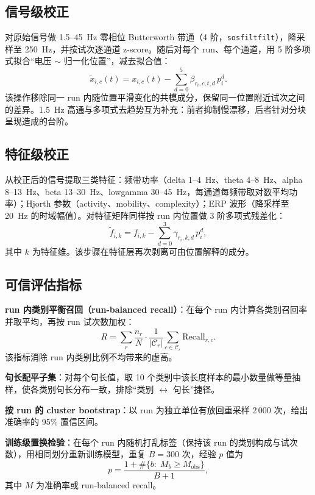 \documentclass[twocolumn,10pt]{ctexart}
\begin{document}
\subsection{信号级校正}

对原始信号做 1.5--45~Hz 零相位 Butterworth 带通（4 阶，\texttt{sosfiltfilt}），降采样至 250~Hz，并按试次逐通道 z-score。随后对每个 run、每个通道，用 5 阶多项式拟合“电压 $\sim$ 归一化位置”，减去拟合值：
\begin{equation}
\tilde{x}_{i,c}(t)=x_{i,c}(t)-\sum_{d=0}^{5}\beta_{r_i,c,t,d}\,p_i^d .
\end{equation}
该操作移除同一 run 内随位置平滑变化的共模成分，保留同一位置附近试次之间的差异。1.5~Hz 高通与多项式去趋势互为补充：前者抑制慢漂移，后者针对分块呈现造成的台阶。

\subsection{特征级校正}

从校正后的信号提取三类特征：频带功率（delta 1--4~Hz、theta 4--8~Hz、alpha 8--13~Hz、beta 13--30~Hz、lowgamma 30--45~Hz，每通道每频带取对数平均功率）；Hjorth 参数（activity、mobility、complexity）；ERP 波形（降采样至 20~Hz 的时域幅值）。对特征矩阵同样按 run 内位置做 3 阶多项式残差化：
\begin{equation}
\tilde{f}_{i,k}=f_{i,k}-\sum_{d=0}^{3}\gamma_{r_i,k,d}\,p_i^d ,
\end{equation}
其中 $k$ 为特征维。该步骤在特征层再次剥离可由位置解释的成分。

\subsection{可信评估指标}

\textbf{run 内类别平衡召回（run-balanced recall）}：在每个 run 内计算各类别召回率并取平均，再按 run 试次数加权：
\begin{equation}
R=\sum_{r}\frac{n_r}{N}\cdot\frac{1}{|\mathcal{C}_r|}\sum_{c\in\mathcal{C}_r}\mathrm{Recall}_{r,c}.
\end{equation}
该指标消除 run 内类别比例不均带来的虚高。

\textbf{句长配平子集}：对每个句长值，取 10 个类别中该长度样本的最小数量做等量抽样，使各类别句长分布一致，排除“类别 $\leftrightarrow$ 句长”捷径。

\textbf{按 run 的 cluster bootstrap}：以 run 为独立单位有放回重采样 2\,000 次，给出准确率的 95\% 置信区间。

\textbf{训练级置换检验}：在每个 run 内随机打乱标签（保持该 run 的类别构成与试次数），用相同划分重新训练模型，重复 $B=300$ 次，经验 $p$ 值为
\begin{equation}
p=\frac{1+\#\{b:\;M_b\ge M_{\mathrm{obs}}\}}{B+1},
\end{equation}
其中 $M$ 为准确率或 run-balanced recall。
\end{document}
